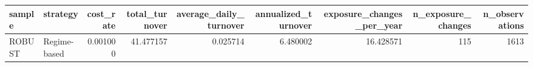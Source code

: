 \begin{tabular}{llrrrrrrr}
\toprule
sample & strategy & cost_rate & total_turnover & average_daily_turnover & annualized_turnover & exposure_changes_per_year & n_exposure_changes & n_observations \\
\midrule
ROBUST & Regime-based & 0.001000 & 41.477157 & 0.025714 & 6.480002 & 16.428571 & 115 & 1613 \\
\bottomrule
\end{tabular}
